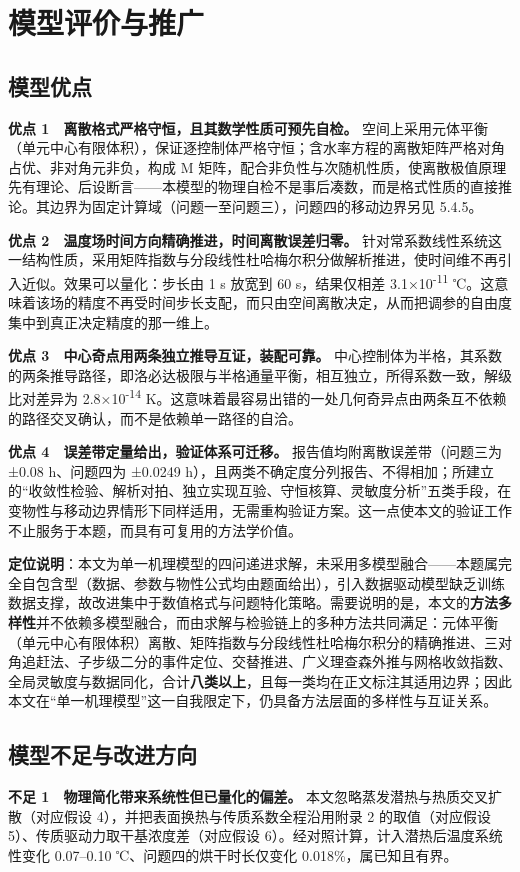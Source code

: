 \section{模型评价与推广}
\subsection{模型优点}
\textbf{优点 1　离散格式严格守恒，且其数学性质可预先自检。} 空间上采用元体平衡（单元中心有限体积），保证逐控制体严格守恒；含水率方程的离散矩阵严格对角占优、非对角元非负，构成 M 矩阵，配合非负性与次随机性质，使离散极值原理先有理论、后设断言——本模型的物理自检不是事后凑数，而是格式性质的直接推论。其边界为固定计算域（问题一至问题三），问题四的移动边界另见 5.4.5。

\textbf{优点 2　温度场时间方向精确推进，时间离散误差归零。} 针对常系数线性系统这一结构性质，采用矩阵指数与分段线性杜哈梅尔积分做解析推进，使时间维不再引入近似。效果可以量化：步长由 1 s 放宽到 60 s，结果仅相差 3.1×10\textsuperscript{-11} ℃。这意味着该场的精度不再受时间步长支配，而只由空间离散决定，从而把调参的自由度集中到真正决定精度的那一维上。

\textbf{优点 3　中心奇点用两条独立推导互证，装配可靠。} 中心控制体为半格，其系数的两条推导路径，即洛必达极限与半格通量平衡，相互独立，所得系数一致，解级比对差异为 2.8×10\textsuperscript{-14} K。这意味着最容易出错的一处几何奇异点由两条互不依赖的路径交叉确认，而不是依赖单一路径的自洽。

\textbf{优点 4　误差带定量给出，验证体系可迁移。} 报告值均附离散误差带（问题三为 ±0.08 h、问题四为 ±0.0249 h），且两类不确定度分列报告、不得相加；所建立的“收敛性检验、解析对拍、独立实现互验、守恒核算、灵敏度分析”五类手段，在变物性与移动边界情形下同样适用，无需重构验证方案。这一点使本文的验证工作不止服务于本题，而具有可复用的方法学价值。

\textbf{定位说明}：本文为单一机理模型的四问递进求解，未采用多模型融合——本题属完全自包含型（数据、参数与物性公式均由题面给出），引入数据驱动模型缺乏训练数据支撑，故改进集中于数值格式与问题特化策略。需要说明的是，本文的\textbf{方法多样性}并不依赖多模型融合，而由求解与检验链上的多种方法共同满足：元体平衡（单元中心有限体积）离散、矩阵指数与分段线性杜哈梅尔积分的精确推进、三对角追赶法、子步级二分的事件定位、交替推进、广义理查森外推与网格收敛指数、全局灵敏度与数据同化，合计\textbf{八类以上}，且每一类均在正文标注其适用边界；因此本文在“单一机理模型”这一自我限定下，仍具备方法层面的多样性与互证关系。

\subsection{模型不足与改进方向}
\textbf{不足 1　物理简化带来系统性但已量化的偏差。} 本文忽略蒸发潜热与热质交叉扩散（对应假设 4），并把表面换热与传质系数全程沿用附录 2 的取值（对应假设 5）、传质驱动力取干基浓度差（对应假设 6）。经对照计算，计入潜热后温度系统性变化 0.07–0.10 ℃、问题四的烘干时长仅变化 0.018\%，属已知且有界。

